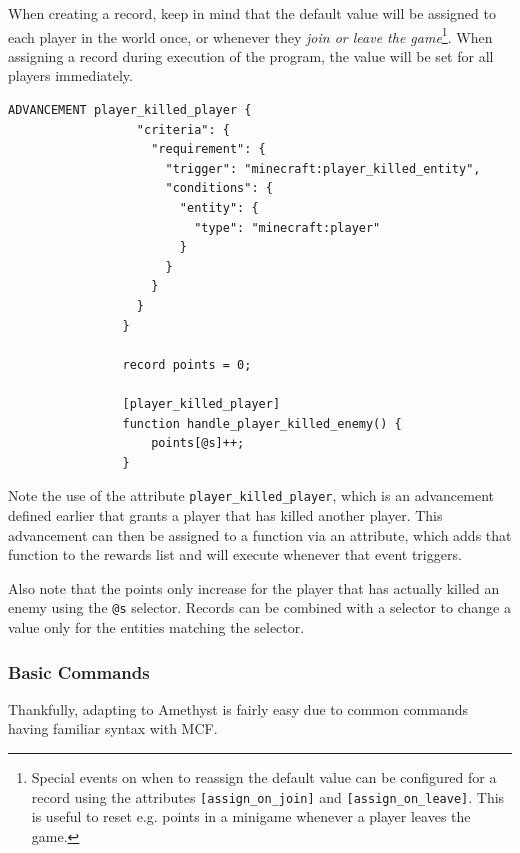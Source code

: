 \documentclass[12pt]{article}
\begin{document}
            When creating a record, keep in mind that the default value will be assigned to each player in the world once, or whenever they \textit{join or leave the game}\footnote{Special events on when to reassign the default value can be configured for a record using the attributes \lstinline{[assign_on_join]} and \lstinline{[assign_on_leave]}. This is useful to reset e.g. points in a minigame whenever a player leaves the game.}. When assigning a record during execution of the program, the value will be set for all players immediately.
            
            \label{first_data_resource} \begin{lstlisting}[title=Increase points for a player that kills another player]
                ADVANCEMENT player_killed_player {
                  "criteria": {
                    "requirement": {
                      "trigger": "minecraft:player_killed_entity",
                      "conditions": {
                        "entity": {
                          "type": "minecraft:player"
                        }
                      }
                    }
                  }
                }
            
                record points = 0;
                
                [player_killed_player]
                function handle_player_killed_enemy() {
                    points[@s]++;
                }
            \end{lstlisting}
            
            Note the use of the attribute \lstinline{player_killed_player}, which is an advancement defined earlier that grants a player that has killed another player. This advancement can then be assigned to a function via an attribute, which adds that function to the rewards list and will execute whenever that event triggers.
            
            Also note that the points only increase for the player that has actually killed an enemy using the \lstinline{@s} selector. Records can be combined with a selector to change a value only for the entities matching the selector.
            
        \subsubsection{Basic Commands}
            Thankfully, adapting to Amethyst is fairly easy due to common commands having familiar syntax with MCF.
            
\end{document}
